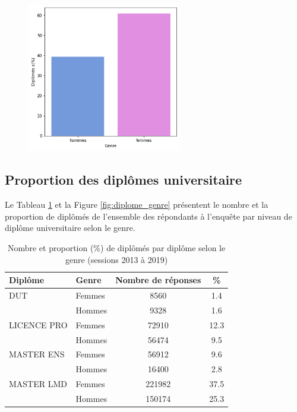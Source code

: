 \documentclass[12pt, a4paper, titlepage, table]{article}
\begin{document}
		\begin{figure}[H]
			\centering
			\includegraphics[width=0.6\textwidth]{../graphs/proportion_genre.png}
			\label{fig:genre_reponses}
		\end{figure}
	
	\subsection{Proportion des diplômes universitaire}
	Le Tableau \ref{tab:diplome_genre} et la Figure \ref{fig:diplome_genre} présentent le nombre et la proportion de diplômés de l'ensemble des répondants à l'enquête par niveau de diplôme universitaire selon le genre. 
	
		\begin{table}[H]
			\centering
			\begin{tabular}{llcc}
				\toprule
				\textbf{Diplôme} & \textbf{Genre} & \textbf{Nombre de réponses} & \textbf{\%} \\
				\midrule
				DUT & Femmes & 8560 & 1.4 \\
				& Hommes & 9328 & 1.6 \\
				\midrule
				LICENCE PRO & Femmes & 72910 & 12.3 \\
				& Hommes & 56474 & 9.5 \\
				\midrule
				MASTER ENS & Femmes & 56912 & 9.6 \\
				& Hommes & 16400 & 2.8 \\
				\midrule
				MASTER LMD & Femmes & 221982 & 37.5 \\
				& Hommes & 150174 & 25.3 \\
				\bottomrule
			\end{tabular}
			\caption{Nombre et proportion (\%) de diplômés par diplôme selon le genre (sessions 2013 à 2019)}
			\label{tab:diplome_genre}
		\end{table}
		
\end{document}
